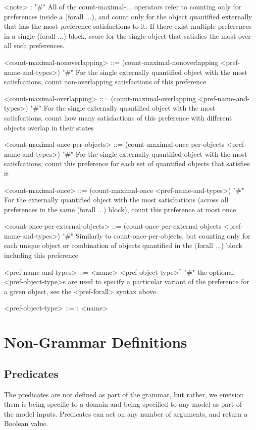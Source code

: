 \documentclass{article}
\begin{document}
\begin{grammar}
<note> : "#" All of the count-maximal-... operators refer to counting only for preferences inside a (forall ...), and count only for the object quantified externally that has the most preference satisfactions to it. If there exist multiple preferences in a single (forall ...) block, score for the single object that satisfies the most over all such preferences.

<count-maximal-nonoverlapping> ::= (count-maximal-nonoverlapping <pref-name-and-types>) "#" For the single externally quantified object with the most satisfcations, count non-overlapping satisfactions of this preference

<count-maximal-overlapping> ::= (count-maximal-overlapping <pref-name-and-types>) "#" For the single externally quantified object with the most satisfcations, count how many satisfactions of this preference with different objects overlap in their states

<count-maximal-once-per-objects> ::= (count-maximal-once-per-objects <pref-name-and-types>) "#" For the single externally quantified object with the most satisfcations, count this preference for each set of quantified objects that satisfies it

<count-maximal-once> ::= (count-maximal-once <pref-name-and-types>) "#" For the externally quantified object with the most satisfcations (across all preferences in the same (forall ...) block), count this preference at most once

<count-once-per-external-objects> ::=  (count-once-per-external-objects <pref-name-and-types>) "#" Similarly to count-once-per-objects, but counting only for each unique object or combination of objects quantified in the (forall ...) block including this preference

<pref-name-and-types> ::= <name> <pref-object-type>$^*$ "#" the optional <pref-object-type>s are used to specify a particular variant of the preference for a given object, see the <pref-forall> syntax above.

    <pref-object-type> ::= : <name>
    



\end{grammar}



\section{Non-Grammar Definitions}


\subsection{Predicates} \label{sec:predicates}
The predicates are not defined as part of the grammar, but rather, we envision them is being specific to a domain and being specified to any model as part of the model inputs. 
Predicates can act on any number of arguments, and return a Boolean value.
            
\end{document}
